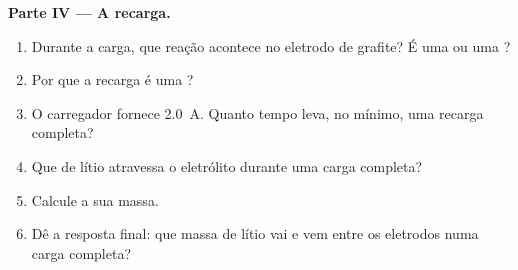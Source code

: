 \begin{problem}
\medskip
\noindent\textbf{Parte IV --- A recarga.}
\begin{enumerate}[resume]
  \item Durante a carga, que reação acontece no eletrodo de grafite? É
        uma  ou uma ?
  \item Por que a recarga é uma ?
  \item O carregador fornece \qty{2.0}{A}. Quanto tempo leva, no mínimo,
        uma recarga completa?
  \item Que  de  lítio atravessa o eletrólito
        durante uma carga completa?
  \item Calcule a sua massa.
  \item Dê a resposta final: que massa de lítio vai e vem entre os
        eletrodos numa carga completa?
\end{enumerate}
\end{problem}

